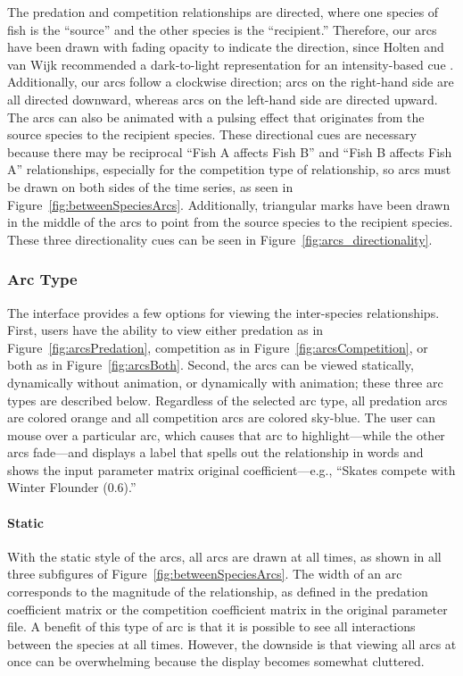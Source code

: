 The predation and competition relationships are directed, where one species of fish is the ``source'' and the other species is the ``recipient.''  Therefore, our arcs have been drawn with fading opacity to indicate the direction, since Holten and van Wijk recommended a dark-to-light representation for an intensity-based cue \cite{holten2009}.  Additionally, our arcs follow a clockwise direction; arcs on the right-hand side are all directed downward, whereas arcs on the left-hand side are directed upward.  The arcs can also be animated with a pulsing effect that originates from the source species to the recipient species.  These directional cues are necessary because there may be reciprocal ``Fish A affects Fish B'' and ``Fish B affects Fish A'' relationships, especially for the competition type of relationship, so arcs must be drawn on both sides of the time series, as seen in Figure~\ref{fig:betweenSpeciesArcs}.  Additionally, triangular marks have been drawn in the middle of the arcs to point from the source species to the recipient species.  These three directionality cues can be seen in Figure~\ref{fig:arcs_directionality}.

\subsubsection{Arc Type}

The interface provides a few options for viewing the inter-species relationships.  First, users have the ability to view either predation as in Figure~\ref{fig:arcsPredation}, competition as in Figure~\ref{fig:arcsCompetition}, or both as in Figure~\ref{fig:arcsBoth}.  Second, the arcs can be viewed statically, dynamically without animation, or dynamically with animation; these three arc types are described below.  Regardless of the selected arc type, all predation arcs are colored orange and all competition arcs are colored sky-blue.  The user can mouse over a particular arc, which causes that arc to highlight---while the other arcs fade---and displays a label that spells out the relationship in words and shows the input parameter matrix original coefficient---e.g., ``Skates compete with Winter Flounder (0.6).''

\paragraph{Static} \label{sec:arcStatic}

With the static style of the arcs, all arcs are drawn at all times, as shown in all three subfigures of Figure~\ref{fig:betweenSpeciesArcs}.  The width of an arc corresponds to the magnitude of the relationship, as defined in the predation coefficient matrix or the competition coefficient matrix in the original parameter file.   A benefit of this type of arc is that it is possible to see all interactions between the species at all times.  However, the downside is that viewing all arcs at once can be overwhelming because the display becomes somewhat cluttered.

